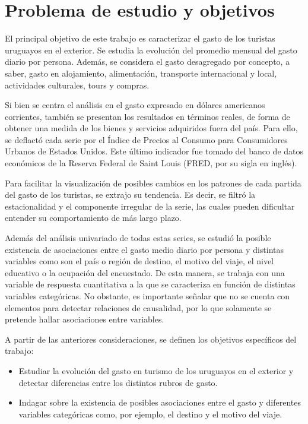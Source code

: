 \documentclass[
]{article}
\providecommand{\tightlist}{%
  \setlength{\itemsep}{0pt}\setlength{\parskip}{0pt}}
\begin{document}
\hypertarget{problema-de-estudio-y-objetivos}{%
\section{\texorpdfstring{Problema de estudio y objetivos
\label{problema}}{Problema de estudio y objetivos }}\label{problema-de-estudio-y-objetivos}}

El principal objetivo de este trabajo es caracterizar el gasto de los
turistas uruguayos en el exterior. Se estudia la evolución del promedio
mensual del gasto diario por persona. Además, se considera el gasto
desagregado por concepto, a saber, gasto en alojamiento, alimentación,
transporte internacional y local, actividades culturales, tours y
compras.

Si bien se centra el análisis en el gasto expresado en dólares
americanos corrientes, también se presentan los resultados en términos
reales, de forma de obtener una medida de los bienes y servicios
adquiridos fuera del país. Para ello, se deflactó cada serie por el
Índice de Precios al Consumo para Consumidores Urbanos de Estados
Unidos. Este último indicador fue tomado del banco de datos económicos
de la Reserva Federal de Saint Louis (FRED, por su sigla en inglés).

Para facilitar la visualización de posibles cambios en los patrones de
cada partida del gasto de los turistas, se extrajo su tendencia. Es
decir, se filtró la estacionalidad y el componente irregular de la
serie, las cuales pueden dificultar entender su comportamiento de más
largo plazo.

Además del análisis univariado de todas estas series, se estudió la
posible existencia de asociaciones entre el gasto medio diario por
persona y distintas variables como son el país o región de destino, el
motivo del viaje, el nivel educativo o la ocupación del encuestado. De
esta manera, se trabaja con una variable de respuesta cuantitativa a la
que se caracteriza en función de distintas variables categóricas. No
obstante, es importante señalar que no se cuenta con elementos para
detectar relaciones de causalidad, por lo que solamente se pretende
hallar asociaciones entre variables.

A partir de las anteriores consideraciones, se definen los objetivos
específicos del trabajo:

\begin{itemize}
\tightlist
\item
  Estudiar la evolución del gasto en turismo de los uruguayos en el
  exterior y detectar diferencias entre los distintos rubros de gasto.
\item
  Indagar sobre la existencia de posibles asociaciones entre el gasto y
  diferentes variables categóricas como, por ejemplo, el destino y el
  motivo del viaje.
\end{itemize}
\end{document}
